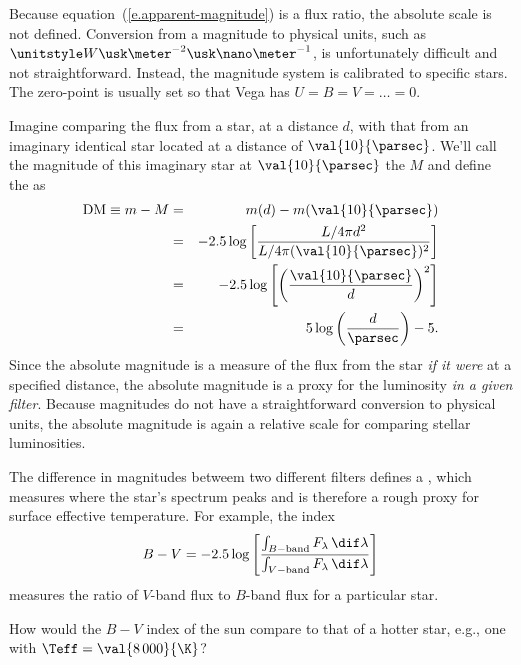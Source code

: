 Because equation~(\ref{e.apparent-magnitude}) is a flux ratio, the absolute scale is not defined. Conversion from a magnitude to physical units, such as $\watt\usk\meter^{-2}\usk\nano\meter^{-1}$, is unfortunately difficult and not straightforward. Instead, the magnitude system is calibrated to specific stars.  The zero-point is usually set so that Vega has $U = B = V = \ldots = 0$. 

Imagine comparing the flux from a star, at a distance $d$, with that from an imaginary identical star located at a distance of $\val{10}{\parsec}$. We'll call the magnitude of this imaginary star at $\val{10}{\parsec}$ the  $M$ and define the  as
\begin{eqnarray}
\mathrm{DM} \equiv m-M &=& m(d) - m(\val{10}{\parsec})\nonumber\\
&=& -2.5\log\left[\frac{L/4\pi d^{2}}{L/4\pi(\val{10}{\parsec})^{2}}\right]\nonumber\\
&=& -2.5\log\left[\left(\frac{\val{10}{\parsec}}{d}\right)^{2}\right]\nonumber \\
&=& 5\log\left(\frac{d}{\parsec}\right) - 5.
\end{eqnarray}
Since the absolute magnitude is a measure of the flux from the star \emph{if it were} at a specified distance, the absolute magnitude is a proxy for the luminosity \emph{in a given filter}. Because magnitudes do not have a straightforward conversion to physical units, the absolute magnitude is again a relative scale for comparing stellar luminosities.

 The difference in magnitudes betweem two different filters defines a , which measures where the star's spectrum peaks and is therefore a rough proxy for surface effective temperature. For example, the index
\[
	B - V = -2.5\log\left[\frac{\int_{B-\mathrm{band}}F_{\lambda}\,\dif\lambda}{\int_{V-\mathrm{band}}F_{\lambda}\,\dif\lambda}\right]
\]
measures the ratio of $V$-band flux to $B$-band flux for a particular star.

\begin{exercisebox}
How would the $B-V$ index of the sun compare to that of a hotter star, e.g., one with $\Teff = \val{8\,000}{\K}$?
\end{exercisebox}

